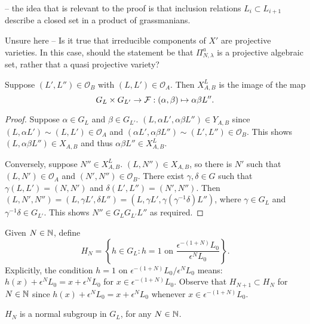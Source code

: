 \documentclass[a4paper, 11pt]{report}
\begin{document}
\begin{remark}\color{blue}
 -- the idea that is relevant to the proof is that inclusion relations $L_i\subset L_{i+1}$ describe a closed set in a product of grassmanians.
 
 Unsure here -- Is it true that irreducible components of $X'$ are projective varieties. In this case, should the statement be that $\Pi_{N,\lambda}^a$ is a projective algebraic set, rather that a quasi projective variety?
\end{remark}

\begin{lemma}
Suppose $(L',L'')\in\mathcal{O}_B$ with $(L,L')\in\mathcal{O}_A$. Then $X_{A,B}^L$ is the image of the map
\begin{equation*}
G_L\times G_{L'}\to\mathcal{F}: (\alpha,\beta)\mapsto \alpha\beta L''.
\end{equation*}
\end{lemma}

\begin{proof}
Suppose $\alpha\in G_L$ and $\beta\in G_{L'}$. $(L,\alpha L',\alpha\beta L'')\in Y_{A,B}$ since $(L,\alpha L')\sim (L,L')\in\mathcal{O}_A$ and $(\alpha L',\alpha\beta L'')\sim (L',L'')\in\mathcal{O}_B$. This shows $(L,\alpha\beta L'')\in X_{A,B}$ and thus $\alpha\beta L''\in X_{A,B}^L$.

Conversely, suppose $N''\in X_{A,B}^L$. $(L,N'')\in X_{A,B}$, so there is $N'$ such that $(L,N')\in\mathcal{O}_A$ and $(N',N'')\in\mathcal{O}_B$. There exist $\gamma,\delta\in G$ such that $\gamma (L,L') = (N,N')$ and $\delta (L',L'') = (N',N'')$. Then $(L,N',N'') = (L,\gamma L', \delta L'') = (L, \gamma L',\gamma (\gamma^{-1}\delta)L'')$, where $\gamma\in G_L$ and $\gamma^{-1}\delta\in G_{L'}$. This shows $N'' \in G_L G_{L'} L''$ as required.
\end{proof}

Given $N\in\mathbb{N}$, define
\begin{equation*}
H_N = \left\{ h\in G_L: h=1 \text{ on } \frac{\epsilon^{-(1+N)}L_0}{\epsilon^N L_0} \right\}.
\end{equation*}
Explicitly, the condition $h=1$ on $\epsilon^{-(1+N)}L_0/{\epsilon^N L_0}$ means: $h(x) + \epsilon^N L_0 = x + \epsilon^N L_0$ for $x\in\epsilon^{-(1+N)}L_0$. Observe that $H_{N+1}\subset H_N$ for $N\in\mathbb{N}$ since $h(x) + \epsilon^N L_0 = x + \epsilon^N L_0$ whenever $x\in\epsilon^{-(1+N)}L_0$.

\begin{lemma}
$H_N$ is a normal subgroup in $G_L$, for any $N\in\mathbb{N}$.
\end{lemma}
\end{document}
